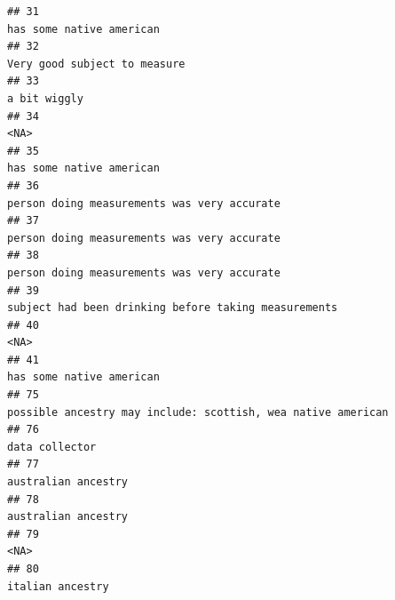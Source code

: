 \documentclass[]{article}
\begin{document}
\begin{verbatim}
## 31                                                                                                                             has some native american
## 32                                                                                                                         Very good subject to measure
## 33                                                                                                                                         a bit wiggly
## 34                                                                                                                                                 <NA>
## 35                                                                                                                             has some native american
## 36                                                                                                          person doing measurements was very accurate
## 37                                                                                                          person doing measurements was very accurate
## 38                                                                                                          person doing measurements was very accurate
## 39                                                                                                 subject had been drinking before taking measurements
## 40                                                                                                                                                 <NA>
## 41                                                                                                                             has some native american
## 75                                                                                         possible ancestry may include: scottish, wea native american
## 76                                                                                                                                       data collector
## 77                                                                                                                                  australian ancestry
## 78                                                                                                                                  australian ancestry
## 79                                                                                                                                                 <NA>
## 80                                                                                                                                     italian ancestry

\end{verbatim}
\end{document}
